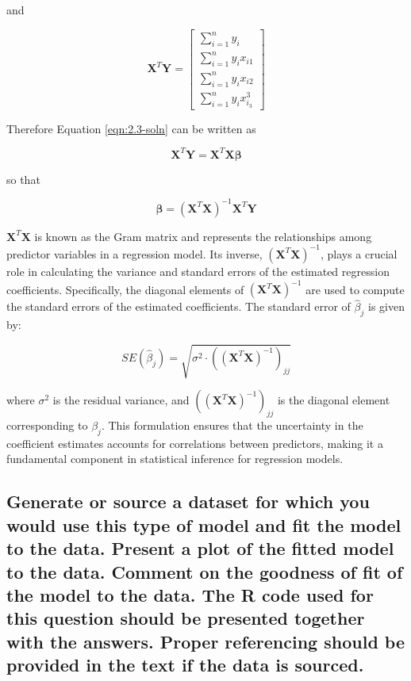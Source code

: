\documentclass[]{article}
\begin{document}
\noindent and

$$
\textbf{X}^T \textbf{Y}
=
\begin{bmatrix}
	\sum_{i=1}^{n}y_i \\
	\sum_{i=1}^{n}y_ix_{i1}\\
	\sum_{i=1}^{n}y_ix_{i2}\\
	\sum_{i=1}^{n}y_ix_{i_3}^3
\end{bmatrix}
$$

\noindent Therefore Equation \ref{eqn:2.3-soln} can be written as

\begin{equation}
	\mathbf{X}^T \mathbf{Y} = \mathbf{X}^T \mathbf{X} \boldsymbol{\beta}
\end{equation}

\noindent so that

\begin{equation}
	\boldsymbol{\beta} = (\mathbf{X}^T \mathbf{X})^{-1} \mathbf{X}^T \mathbf{Y}
\end{equation}


$\mathbf{X}^T \mathbf{X}$  is known as the Gram matrix and represents the relationships among predictor variables in a regression model. Its inverse, $(\mathbf{X}^T \mathbf{X})^{-1}$, plays a crucial role in calculating the variance and standard errors of the estimated regression coefficients. Specifically, the diagonal elements of $(\mathbf{X}^T \mathbf{X})^{-1}$ are used to compute the standard errors of the estimated coefficients. The standard error of $\hat{\beta}_j$ is given by:

$$
SE(\hat{\beta}_j) = \sqrt{\sigma^2 \cdot \left( (\mathbf{X}^T \mathbf{X})^{-1} \right)_{jj}}
$$

where $\sigma^2$ is the residual variance, and $\left( (\mathbf{X}^T \mathbf{X})^{-1} \right)_{jj}$ is the diagonal element corresponding to $\beta_j$. This formulation ensures that the uncertainty in the coefficient estimates accounts for correlations between predictors, making it a fundamental component in statistical inference for regression models.


\subsection{ Generate or source a dataset for which you would use this type of model and fit the model to the data.  Present a plot of the fitted model to the data.  Comment on the goodness of fit of the model to the data.  The R code used for this question should be presented together with the answers. Proper referencing should be provided in the text if the data is sourced.}
\end{document}
